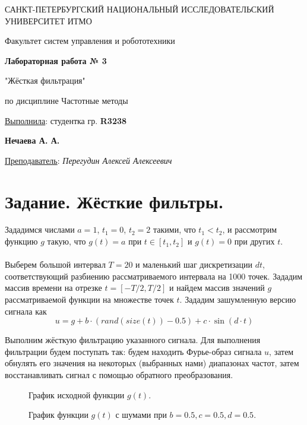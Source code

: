\documentclass[a5paper, 10pt]{article}
\theoremstyle{definition}
\theoremstyle{plain}
\theoremstyle{remark}
\newcommand*{\titlePage}{
	\thispagestyle{title}
	\begingroup
	\begin{center}
		\vspace*{6ex}
		
		{\small
			САНКТ-ПЕТЕРБУРГСКИЙ НАЦИОНАЛЬНЫЙ ИССЛЕДОВАТЕЛЬСКИЙ УНИВЕРСИТЕТ ИТМО	
		}
		
		\vspace*{2ex}
		
		{\normalsize
			Факультет систем управления и робототехники
		}
		
		\vspace*{15ex}
		
		{\Large \bfseries 
			Лабораторная работа № 3
		}
\vspace*{2ex}
	{\Large \bfseries 
			
"Жёсткая фильтрация"
		}
\vspace*{2ex}
		
		{\normalsize
			по дисциплине Частотные методы
		}

	\end{center}
	\vspace*{20ex}
	\begin{flushright}
		{\large 
			\underline{Выполнила}: студентка гр. \textbf{R3238}\\
			\begin{flushright}
				\textbf{Нечаева А. А.}\\
			\end{flushright}
		}
		
		\vspace*{5ex}
		
		{\large 
			\underline{Преподаватель}: \textit{Перегудин Алексей Алексеевич}
		}
	\end{flushright}	
	\newpage
	\setcounter{page}{1}
	\endgroup}
\begin{document}
	\titlePage
	\pagestyle{style}
\newpage

\section{Задание. Жёсткие фильтры.}
Зададимся числами $a = 1$, $t_1 = 0$, $t_2 = 2$ такими, что $t_1 < t_2$, и рассмотрим функцию $g$ такую, что $g(t) = a$ при $t \in [t_1, t_2]$ и $g(t) = 0$ при других $t$.\\
\\
 Выберем большой интервал $T = 20$ и маленький шаг дискретизации $dt$, соответствующий разбиению рассматриваемого интервала на 1000 точек. Зададим массив времени на отрезке $t = [-T/2,T/2]$ и найдем массив значений $g$ рассматриваемой функции на множестве точек $t$. Зададим зашумленную версию сигнала как
$$u = g + b \cdot (rand(size(t))-0.5) + c \cdot \sin (d \cdot t)$$

Выполним жёсткую фильтрацию указанного сигнала. Для выполнения фильтрации будем поступать так: будем находить Фурье-образ сигнала $u$, затем обнулять его значения на некоторых (выбранных нами) диапазонах частот, затем восстанавливать сигнал с помощью обратного преобразования.


\begin{figure}[h]
\caption{График исходной функции $g(t)$.}
\end{figure}

\begin{figure}[h]
\caption{График функции $g(t)$ с шумами при $b = 0.5, c = 0.5, d = 0.5$.}
\end{figure}
\end{document}
